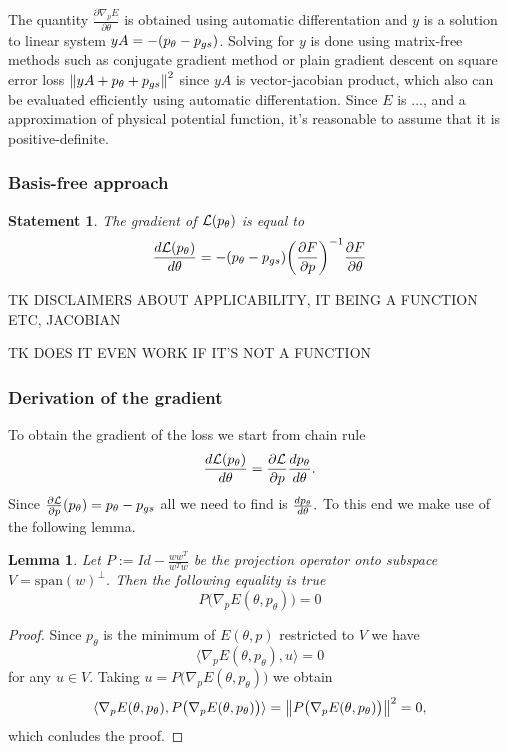 \documentclass[a4paper,10pt]{report}
\newtheorem{statement}{Statement}
\newtheorem{lemma}{Lemma}
\begin{document}
The quantity $\frac{\partial \nabla_p E}{\partial \theta}$ is obtained using automatic differentation and $y$ is a solution to linear system $yA = -(p_\theta-p_{gs})$. Solving for $y$ is done using matrix-free methods such as conjugate gradient method or plain gradient descent on square error loss $\left\|yA + p_\theta+p_{gs}\right\|^2$ since $yA$ is vector-jacobian product, which also can be evaluated efficiently using automatic differentation. Since $E$ is ..., and a approximation of physical potential function, it's reasonable to assume that it is positive-definite.

\subsubsection{Basis-free approach}
\begin{statement}
The gradient of $\mathcal{L}(p_\theta)$ is equal to
 \begin{equation}
 \frac{d\mathcal{L}(p_\theta)}{d \theta} = -(p_\theta - p_{gs}) \bigg(\frac{\partial F}{\partial p}\bigg)^{-1}  \frac{\partial F}{\partial \theta}
\end{equation}
\end{statement}


TK DISCLAIMERS ABOUT APPLICABILITY, IT BEING A FUNCTION ETC, JACOBIAN

TK DOES IT EVEN WORK IF IT'S NOT A FUNCTION
\subsubsection{Derivation of the gradient}
To obtain the gradient of the loss we start from chain rule
\begin{equation}
 \frac{d\mathcal{L}(p_\theta)}{d \theta} = \frac{\partial \mathcal{L}}{\partial p}\frac{dp_\theta}{d \theta}.
\end{equation}
Since $\frac{\partial \mathcal{L}}{\partial p}(p_\theta )= p_\theta-p_{gs}$ all we need to find is $\frac{dp_\theta}{d \theta}.$ To this end we make use of the following lemma.

\begin{lemma}
 Let $P := Id -\frac{ww^T}{w^Tw} $ be the projection operator onto subspace $V = \text{span}(w)^{\perp}$. Then the following equality is true
 \begin{equation}
  P\big(\nabla_p E(\theta, p_\theta)\big) = 0
 \end{equation}

\end{lemma}

\begin{proof}
  Since $p_\theta$ is the minimum of $E(\theta,p)$ restricted to $V$ we have \[\langle \nabla_p E(\theta,p_{\theta}), u \rangle = 0\] for any $u\in V$. Taking $u = P\big( \nabla_p E(\theta,p_\theta)\big)$ we obtain
  \[\langle \nabla_p E(\theta,p_{\theta}), P\big( \nabla_p E(\theta,p_\theta)\big) \rangle = \left\|P\big( \nabla_p E(\theta,p_\theta)\big)\right\|^2=0,\]
  which conludes the proof.
\end{proof}
\end{document}
